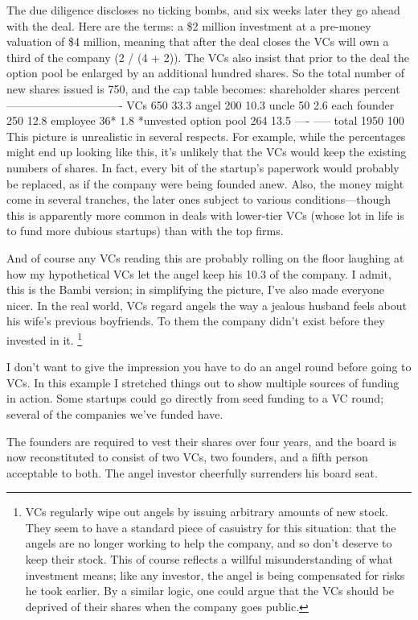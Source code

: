 The due diligence discloses no ticking bombs, and six weeks later they
go ahead with the deal. Here are the terms: a \$2 million investment at
a pre-money valuation of \$4 million, meaning that after the deal closes
the VCs will own a third of the company (2 / (4 + 2)). The VCs also
insist that prior to the deal the option pool be enlarged by an
additional hundred shares. So the total number of new shares issued is
750, and the cap table becomes: shareholder shares percent
------------------------------- VCs 650 33.3 angel 200 10.3 uncle 50 2.6
each founder 250 12.8 employee 36* 1.8 *unvested option pool 264 13.5
---- ----- total 1950 100 This picture is unrealistic in several
respects. For example, while the percentages might end up looking like
this, it's unlikely that the VCs would keep the existing numbers of
shares. In fact, every bit of the startup's paperwork would probably be
replaced, as if the company were being founded anew. Also, the money
might come in several tranches, the later ones subject to various
conditions---though this is apparently more common in deals with
lower-tier VCs (whose lot in life is to fund more dubious startups) than
with the top firms.

And of course any VCs reading this are probably rolling on the floor
laughing at how my hypothetical VCs let the angel keep his 10.3 of the
company. I admit, this is the Bambi version; in simplifying the picture,
I've also made everyone nicer. In the real world, VCs regard angels the
way a jealous husband feels about his wife's previous boyfriends. To
them the company didn't exist before they invested in it.
\footnote{VCs regularly wipe out angels by issuing arbitrary amounts of
new stock. They seem to have a standard piece of casuistry for this
situation: that the angels are no longer working to help the company,
and so don't deserve to keep their stock. This of course reflects a
willful misunderstanding of what investment means; like any investor,
the angel is being compensated for risks he took earlier. By a similar
logic, one could argue that the VCs should be deprived of their shares
when the company goes public.}

I don't want to give the impression you have to do an angel round before
going to VCs. In this example I stretched things out to show multiple
sources of funding in action. Some startups could go directly from seed
funding to a VC round; several of the companies we've funded have.

The founders are required to vest their shares over four years, and the
board is now reconstituted to consist of two VCs, two founders, and a
fifth person acceptable to both. The angel investor cheerfully
surrenders his board seat.

